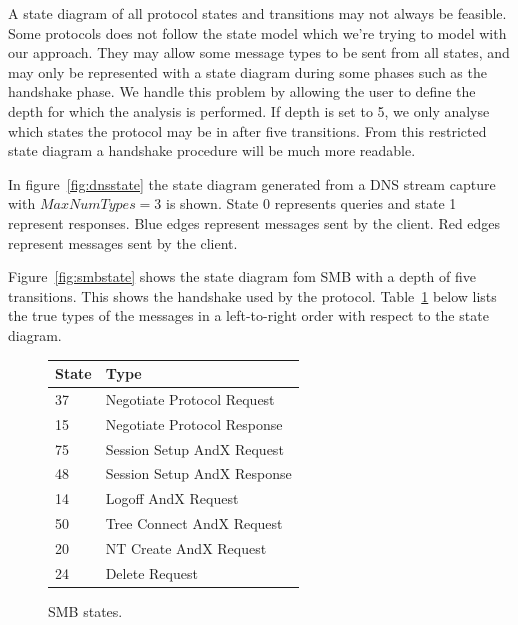\documentclass[a4paper]{report}
\begin{document}
A state diagram of all protocol states and transitions may not always be
feasible. Some protocols does not follow the state model which we're 
trying to model with our approach. They may allow some message types to
be sent from all states, and may only be represented with a state diagram
during some phases such as the handshake phase. We handle this problem by
allowing the user to define the depth for which the analysis is performed.
If depth is set to 5, we only analyse which states the protocol may be in
after five transitions. From this restricted state diagram a handshake
procedure will be much more readable.


In figure~\ref{fig:dnsstate} the state diagram generated from a DNS stream
capture with $MaxNumTypes = 3$ is shown. State 0 represents queries and state 1
represent responses. Blue edges represent messages sent by the client. Red
edges represent messages sent by the client.

Figure~\ref{fig:smbstate} shows the state diagram fom SMB with a depth of
five transitions. This shows the handshake used by the protocol.
Table~\ref{table:smb} below lists the true types of the messages in a
left-to-right order with respect to the state diagram.

\begin{figure}
    \centering
    \begin{tabular}{ | l | l |}
        \hline
        \textbf{State}&\textbf{Type}\\ \hline
        37          & Negotiate Protocol Request    \\ \hline
        15          & Negotiate Protocol Response   \\ \hline
        75          & Session Setup AndX Request    \\ \hline
        48          & Session Setup AndX Response   \\ \hline
        14          & Logoff AndX Request           \\ \hline
        50          & Tree Connect AndX Request     \\ \hline
        20          & NT Create AndX Request        \\ \hline
        24          & Delete Request                \\ \hline
    \end{tabular}
    \caption{SMB states.}
    \label{table:smb}
\end{figure}
\end{document}

